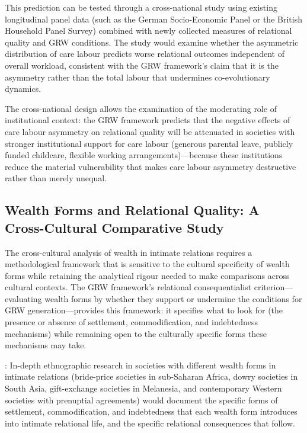 This prediction can be tested through a cross-national study using existing longitudinal panel data (such as the German Socio-Economic Panel or the British Household Panel Survey) combined with newly collected measures of relational quality and GRW conditions. The study would examine whether the asymmetric distribution of care labour predicts worse relational outcomes independent of overall workload, consistent with the GRW framework's claim that it is the asymmetry rather than the total labour that undermines co-evolutionary dynamics.

The cross-national design allows the examination of the moderating role of institutional context: the GRW framework predicts that the negative effects of care labour asymmetry on relational quality will be attenuated in societies with stronger institutional support for care labour (generous parental leave, publicly funded childcare, flexible working arrangements)---because these institutions reduce the material vulnerability that makes care labour asymmetry destructive rather than merely unequal.

\subsection{Wealth Forms and Relational Quality: A Cross-Cultural Comparative Study}
\label{p15:subsec:crosscultural_study}

\noindent
The cross-cultural analysis of wealth in intimate relations requires a methodological framework that is sensitive to the cultural specificity of wealth forms while retaining the analytical rigour needed to make comparisons across cultural contexts. The GRW framework's relational consequentialist criterion---evaluating wealth forms by whether they support or undermine the conditions for GRW generation---provides this framework: it specifies what to look for (the presence or absence of settlement, commodification, and indebtedness mechanisms) while remaining open to the culturally specific forms these mechanisms may take.

: In-depth ethnographic research in societies with different wealth forms in intimate relations (bride-price societies in sub-Saharan Africa, dowry societies in South Asia, gift-exchange societies in Melanesia, and contemporary Western societies with prenuptial agreements) would document the specific forms of settlement, commodification, and indebtedness that each wealth form introduces into intimate relational life, and the specific relational consequences that follow.

